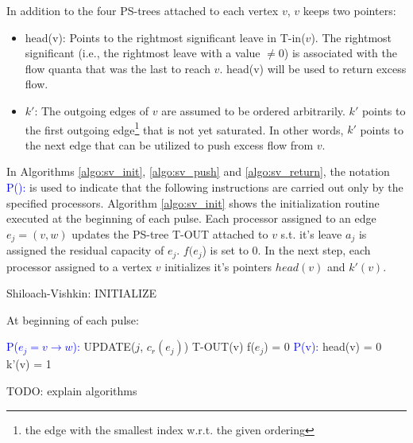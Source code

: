 \documentclass[a4paper,10pt, twocolumn]{article}
\begin{document}
In addition to the four PS-trees attached to each vertex $v$, $v$ keeps two pointers:
\begin{itemize}
	\item head(v): Points to the rightmost significant leave in T-in($v$). The rightmost significant (i.e., the rightmost leave with a value $\neq 0$) is associated with the flow quanta that was the last to reach $v$. head(v) will be used to return excess flow. 
	\item $k'$: The outgoing edges of $v$ are assumed to be ordered arbitrarily. $k'$ points to the first outgoing edge\footnote{the edge with the smallest index w.r.t. the given ordering} that is not yet saturated. In other words, $k'$ points to the next edge that can be utilized to push excess flow from $v$.  
\end{itemize}

In Algorithms \ref{algo:sv_init}, \ref{algo:sv_push} and \ref{algo:sv_return}, the notation \textcolor{blue}{P():} is used to indicate that the following instructions are carried out only by the specified processors. Algorithm \ref{algo:sv_init} shows the initialization routine executed at the beginning of each pulse. Each processor assigned to an edge $e_j = (v, w)$ updates the PS-tree T-OUT attached to $v$ s.t. it's leave $a_j$ is assigned the residual capacity of $e_j$. $f(e_j$) is set to 0. In the next step, each processor assigned to a vertex $v$ initializes it's pointers $head(v)$ and $k'(v)$.

\begin{algorithm}
\caption{Shiloach-Vishkin: INITIALIZE}
\label{algo:sv_init}
At beginning of each pulse:	
\begin{algorithmic}[1]
		\State \textcolor{blue}{P($e_j = v \rightarrow w$):}
		\State UPDATE($j$, $c_r(e_j)$) T-OUT(v)
		\State f($e_j$) = 0
		\State \textcolor{blue}{P(v):}
		\State head(v) = 0	
		\State k'(v) = 1	
 	\EndFunction
\end{algorithmic}
\end{algorithm}

TODO: explain algorithms
\end{document}
